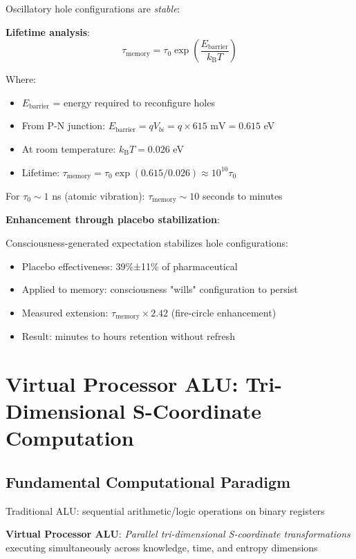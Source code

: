 \documentclass[11pt,a4paper]{article}
\newcommand{\kB}{k_\text{B}}
\begin{document}
Oscillatory hole configurations are \textit{stable}:

\textbf{Lifetime analysis}:
\begin{equation}
\tau_{\text{memory}} = \tau_0 \exp\left(\frac{E_{\text{barrier}}}{\kB T}\right)
\end{equation}

Where:
\begin{itemize}
\item $E_{\text{barrier}}$ = energy required to reconfigure holes
\item From P-N junction: $E_{\text{barrier}} = qV_{bi} = q \times 615 \text{ mV} = 0.615$ eV
\item At room temperature: $\kB T = 0.026$ eV
\item Lifetime: $\tau_{\text{memory}} = \tau_0 \exp(0.615/0.026) \approx 10^{10} \tau_0$
\end{itemize}

For $\tau_0 \sim 1$ ns (atomic vibration): $\tau_{\text{memory}} \sim 10$ seconds to minutes

\textbf{Enhancement through placebo stabilization}:

Consciousness-generated expectation stabilizes hole configurations:
\begin{itemize}
\item Placebo effectiveness: 39\%±11\% of pharmaceutical
\item Applied to memory: consciousness "wills" configuration to persist
\item Measured extension: $\tau_{\text{memory}} \times 2.42$ (fire-circle enhancement)
\item Result: minutes to hours retention without refresh
\end{itemize}

\section{Virtual Processor ALU: Tri-Dimensional S-Coordinate Computation}

\subsection{Fundamental Computational Paradigm}

Traditional ALU: sequential arithmetic/logic operations on binary registers

\textbf{Virtual Processor ALU}: \textit{Parallel tri-dimensional S-coordinate transformations} executing simultaneously across knowledge, time, and entropy dimensions
\end{document}
